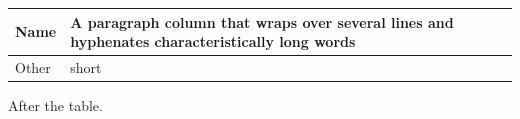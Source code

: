 \documentclass{article}
\begin{document}
\begin{center}
\begin{tabular}{|l|p{3.5cm}|}
\hline
Name & A paragraph column that wraps over several lines and hyphenates characteristically long words \\
\hline
Other & short \\
\hline
\end{tabular}
\end{center}
After the table.
\end{document}
